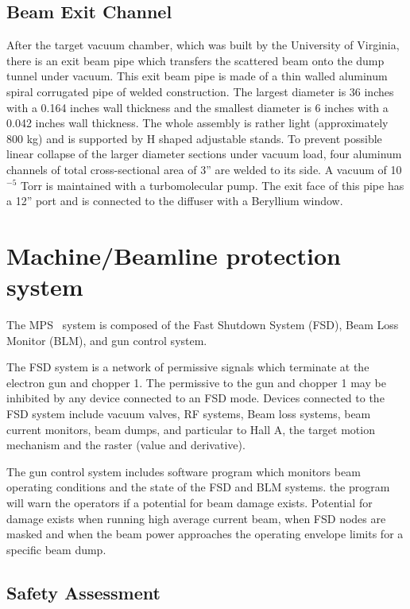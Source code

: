 {\subsection{Beam Exit Channel}

After the target vacuum chamber, which was built by
the University of Virginia, there is an exit beam pipe which 
transfers the scattered beam onto the dump tunnel under vacuum. This exit beam 
pipe is made of a thin walled aluminum spiral corrugated pipe of welded 
construction. The largest diameter is 36 inches with a 0.164 inches wall 
thickness and the smallest diameter is 6 inches with a 0.042 inches wall 
thickness. The whole assembly is rather light (approximately 800 kg) and is 
supported by H shaped adjustable stands. To prevent possible linear collapse 
of the larger diameter sections under vacuum load, four aluminum channels of 
total cross-sectional area of 3'' are welded to its side. A vacuum of 
10$^{-5}$ Torr is maintained with a turbomolecular pump. The exit face of this 
pipe has a 12'' port and is connected to the diffuser with a Beryllium 
window.

}

\section{ Machine/Beamline protection system}
\label{sec:beam-fsd}

The MPS~\cite{MPScebaf} system is composed of the Fast Shutdown System (FSD), Beam Loss 
Monitor (BLM), and gun control system.

The FSD system is a network of permissive signals which terminate at the 
electron gun and chopper 1. The permissive to the gun and chopper
1 may be inhibited by any device connected to an FSD mode. Devices connected to the 
FSD system include vacuum valves, RF systems, Beam loss systems, beam current 
monitors, beam dumps, and particular to Hall A, the target motion mechanism 
and the raster (value and derivative).

The gun control system includes software program which monitors beam 
operating conditions and the state of the FSD and BLM systems. the program 
will warn the operators if a potential for beam damage exists. Potential for 
damage exists when running high average current beam, when FSD nodes are 
masked and when the beam power approaches the operating envelope limits for a 
specific beam dump.

\clearpage
\begin{safetyen}{10}{10}
\section{Safety Assessment}
\end{safetyen}
 
